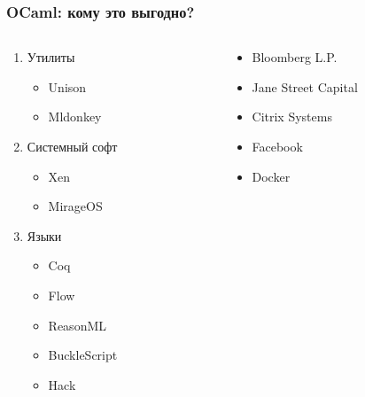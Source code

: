 \begin{frame}
  \frametitle{OCaml: кому это выгодно?}
  \large
  \begin{columns}
    \begin{column}{6cm}
      \begin{enumerate}
        \item Утилиты
        \begin{itemize} \normalsize
          \item Unison
          \item Mldonkey
        \end{itemize}
        \pause

        \item Системный софт
        \begin{itemize} \normalsize
          \item Xen
          \item MirageOS
        \end{itemize}
        \pause

        \item Языки
        \begin{itemize} \normalsize
          \item Coq
          \item Flow
          \item ReasonML
          \item BuckleScript
          \item Hack
        \end{itemize}
      \end{enumerate}
    \end{column}
    \pause

    \begin{column}{6cm}
      \Large
      \begin{itemize}
        \item Bloomberg L.P.
        \item Jane Street Capital
        \item Citrix Systems
        \item Facebook
        \item Docker
      \end{itemize}
    \end{column}
  \end{columns}
\end{frame}

